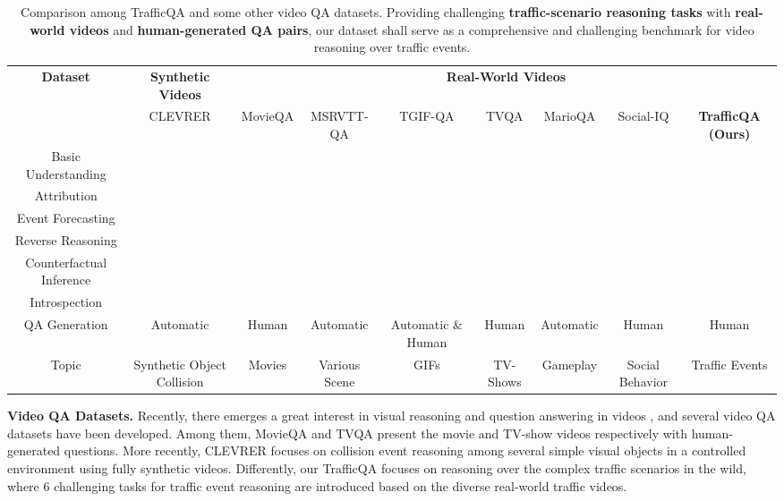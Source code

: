 \documentclass[final]{cvpr}
\begin{document}
\begin{table*}[t]
\caption{Comparison among TrafficQA and some other video QA datasets. Providing challenging \textbf{traffic-scenario reasoning tasks} with \textbf{real-world videos} and \textbf{human-generated QA pairs}, our dataset shall serve as a comprehensive and challenging benchmark for video reasoning over traffic events.}
\vspace{-0.2cm}
\begin{center}
\scriptsize
\setlength\tabcolsep{0.5pt}
\begin{tabular}{c|c|ccccccc} \hline
\multirow{2}{*}{\textbf{Dataset}} & \textbf{Synthetic Videos} & \multicolumn{7}{c}{\textbf{Real-World Videos}} \\
\cline{2-9}
& CLEVRER \cite{yi2019clevrer} 
        & MovieQA \cite{tapaswi2016movieqa} & MSRVTT-QA \cite{xu2017video} & TGIF-QA \cite{jang2017tgif} & TVQA \cite{lei2018tvqa} &  MarioQA \cite{mun2017marioQA} & Social-IQ \cite{zadeh2019social} &  \textbf{TrafficQA (Ours)} \\ \hline
Basic Understanding  &  &  &  &  &  &  &  & \textbf{} \\ 
Attribution  &  &  &  &  &  &  &  & \textbf{} \\
Event Forecasting &  &     &  &      &      &      &      & \textbf{}  \\ 
Reverse Reasoning  &      &      &  &      &      &      &      & \textbf{} \\ 
Counterfactual Inference &  &     &  &      &      &      &      & \textbf{} \\ 
Introspection   &      &     & &       &      &      &      & \textbf{} \\
\hline
QA Generation & Automatic & Human & Automatic & Automatic \& Human & Human & Automatic & Human & Human \\ \hline
Topic & Synthetic Object Collision & Movies & Various Scene & GIFs & TV-Shows & Gameplay & Social Behavior & Traffic Events\\ \hline
\end{tabular}
\end{center}
\label{table:dataset_comparison}
\vspace{-0.5cm}
\end{table*}

\textbf{Video QA Datasets.}
Recently, there emerges a great interest in visual reasoning and question answering in videos \cite{10.1007/s11263-016-0987-1,maharaj2017dataset,zhu2017uncovering,ijcai2017-280}, and several video QA datasets \cite{xu2017video,zeng2016leveraging,tapaswi2016movieqa,zadeh2019social,jang2017tgif,garcia2020knowit,emrvqasongMM18,yu2019activityqa} have been developed. Among them, 
MovieQA \cite{tapaswi2016movieqa} and TVQA \cite{lei2018tvqa} present the movie and TV-show videos respectively with human-generated questions. More recently, 
CLEVRER \cite{yi2019clevrer} focuses on collision event reasoning among several simple visual objects
in a controlled environment using fully synthetic videos. Differently, our TrafficQA focuses on reasoning over the complex traffic scenarios in the wild, where 6 challenging tasks for traffic event reasoning are introduced based on the diverse real-world
traffic
videos.  
\end{document}
